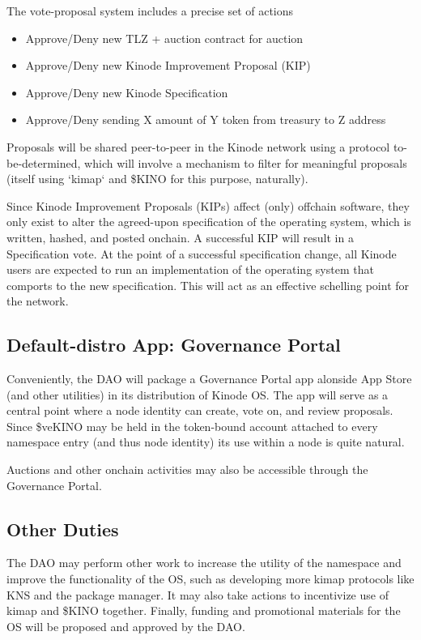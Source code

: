 \documentclass[runningheads]{llncs}
\begin{document}
The vote-proposal system includes a precise set of actions
\begin{itemize}
    \item Approve/Deny new TLZ + auction contract for auction
    \item Approve/Deny new Kinode Improvement Proposal (KIP)
    \item Approve/Deny new Kinode Specification
    \item Approve/Deny sending X amount of Y token from treasury to Z address
\end{itemize}

Proposals will be shared peer-to-peer in the Kinode network using a protocol to-be-determined, which will involve a mechanism to filter for meaningful proposals (itself using `kimap` and \$KINO for this purpose, naturally).

Since Kinode Improvement Proposals (KIPs) affect (only) offchain software, they only exist to alter the agreed-upon specification of the operating system, which is written, hashed, and posted onchain.
A successful KIP will result in a Specification vote.
At the point of a successful specification change, all Kinode users are expected to run an implementation of the operating system that comports to the new specification.
This will act as an effective schelling point for the network.

\subsection{Default-distro App: Governance Portal}
\label{sec:daoportal}

Conveniently, the DAO will package a Governance Portal app alonside App Store (and other utilities) in its distribution of Kinode OS.
The app will serve as a central point where a node identity can create, vote on, and review proposals.
Since \$veKINO may be held in the token-bound account attached to every namespace entry (and thus node identity) its use within a node is quite natural.

Auctions and other onchain activities may also be accessible through the Governance Portal.

\subsection{Other Duties}
\label{sec:daoduties}

The DAO may perform other work to increase the utility of the namespace and improve the functionality of the OS, such as developing more kimap protocols like KNS and the package manager.
It may also take actions to incentivize use of kimap and \$KINO together.
Finally, funding and promotional materials for the OS will be proposed and approved by the DAO.
\end{document}
